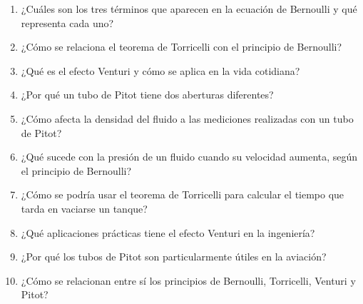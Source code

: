 \documentclass[../main]{subfiles}
\begin{document}
\begin{enumerate}
\item ¿Cuáles son los tres términos que aparecen en la ecuación de Bernoulli y qué representa cada uno?
\item ¿Cómo se relaciona el teorema de Torricelli con el principio de Bernoulli?
\item ¿Qué es el efecto Venturi y cómo se aplica en la vida cotidiana?
\item ¿Por qué un tubo de Pitot tiene dos aberturas diferentes?
\item ¿Cómo afecta la densidad del fluido a las mediciones realizadas con un tubo de Pitot?
\item ¿Qué sucede con la presión de un fluido cuando su velocidad aumenta, según el principio de Bernoulli?
\item ¿Cómo se podría usar el teorema de Torricelli para calcular el tiempo que tarda en vaciarse un tanque?
\item ¿Qué aplicaciones prácticas tiene el efecto Venturi en la ingeniería?
\item ¿Por qué los tubos de Pitot son particularmente útiles en la aviación?
\item ¿Cómo se relacionan entre sí los principios de Bernoulli, Torricelli, Venturi y Pitot?
\end{enumerate}
\end{document}
